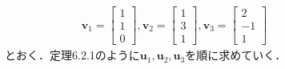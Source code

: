 \documentclass[dvipdfmx]{jsarticle}
\theoremstyle{definition}
\begin{document}
\begin{figure}[H]
    \begin{minipage}{0.60\textwidth}
        \begin{leftbar}
            \begin{align*}
                \bm{v}_1 = \begin{bmatrix} 1 \\ 1 \\ 0 \end{bmatrix} ,
                \bm{v}_2 = \begin{bmatrix} 1 \\ 3 \\ 1 \end{bmatrix} ,
                \bm{v}_3 = \begin{bmatrix} 2 \\ -1 \\ 1 \end{bmatrix}
            \end{align*}
            とおく．定理6.2.1のように$\bm{u}_1, \bm{u}_2, \bm{u}_3$を順に求めていく．
        \end{leftbar}


\end{minipage}
\end{figure}
\end{document}
